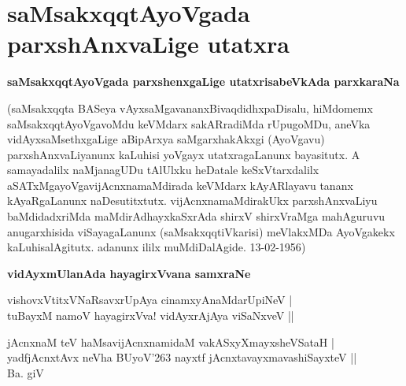 \chapter{saMsakxqqtAyoVgada parxshAnxvaLige utatxra}

\noindent
{\large\bf saMsakxqqtAyoVgada parxshenxgaLige utatxrisabeVkAda parxkaraNa}\label{page19}
\medskip

\noindent
(saMsakxqqta BASeya vAyxsaMgavananxBivaqdidhxpaDisalu, hiMdomemx saMsakxqqtAyoVga\-voMdu keVMdarx sakAR\-radiMda rUpugoMDu, aneVka vidAyxsaMsethxgaLige aBipArxya saMgarxhakAkxgi (AyoVgavu) parxshAnxvaLiyanunx kaLuhisi yoVgayx utatxragaLanunx bayasitutx. A samayadalilx naMjanagUDu tAlUlxku heDatale keSxVtarxdalilx aSATxMgayoVgavijAcnxnamaMdirada keVMdarx kAyARlayavu tananx kAyaRgaLanunx naDesutitxtutx. vijAcnxna\-maMdirakUkx  parxshAnxvaLiyu baMdidadxriMda maMdirAdhayxkaSxrAda shirxV shirxVraMga mahAguruvu anugarxhisida viSayagaLanunx (saMsakxqqtiVkarisi) meVlakxMDa AyoVgakekx kaLuhisalAgitutx. adanunx ililx muMdiDalAgide. {\rm 13-02-1956})  

\bigskip

\noindent
{\large\bf vidAyxmUlanAda hayagirxVvana samxraNe}\label{page19a}
\medskip

\begin{shloka}
vishovxVtitxVNaRsavxrUpAya cinamxyAnaMdarUpiNeV |\\\label{page19c}
tuBayxM namoV hayagirxVva! vidAyxrAjAya viSaNxveV ||
\end{shloka}

\begin{shloka}
jAcnxnaM teV haMsavijAcnxnamidaM vakASxyXmayxsheVSataH |\\\label{page19b}
yadfjAcnxtAvx neVha BUyoV\char'263 nayxtf jAcnxtavayxmavashiSayxteV ||\\
\hfill Ba. giV
\end{shloka}

